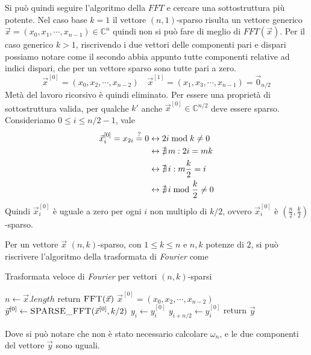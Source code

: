 Si può quindi seguire l'algoritmo della $FFT$ e cercare una sottostruttura più potente. Nel caso base $k=1$ il vettore $\left( n,1 \right)$-sparso risulta un vettore generico $\vec{x}=\left( x_0, x_1,\cdots, x _{n-1} \right) \in \mathbb{C}^n$ quindi non si può fare di meglio di $FFT\left( \vec{x} \right)$. Per il caso generico $k>1$, riscrivendo i due vettori delle componenti pari e dispari possiamo notare come il secondo abbia appunto tutte componenti relative ad indici dispari, che per un vettore sparso sono tutte pari a zero.
\begin{equation*}
    \vec{x}^{[0]}=\left( x_0, x_2,\cdots, x _{n-2} \right)
    \quad 
    \vec{x}^{[1]}=\left( x_1, x_3,\cdots, x _{n-1} \right) = \vec{0}_{n/2}
\end{equation*}
Metà del lavoro ricorsivo è quindi eliminato.
Per essere una proprietà di sottostruttura valida, per qualche $k'$ anche $\vec{x}^{[0]} \in \mathbb{C}^{n/2}$ deve essere sparso. Consideriamo $0 \leq i \leq n/2-1$, vale
\begin{align*}
    \vec{x}_i^{[0]} = x_{2i} \overset{?}{=} 0 
    & \leftrightarrow
    2i \bmod k \neq 0
    \\
    & \leftrightarrow
    \nexists \, m : 2i = mk
    \\
    & \leftrightarrow
    \nexists \, i : m\frac{k}{2} = i
    \\
    & \leftrightarrow
    \nexists \, i \bmod \frac{k}{2} \neq 0
\end{align*}
Quindi $\vec{x}_i^{[0]}$ è uguale a zero per ogni $i$ non multiplo di $k/2$, ovvero $\vec{x}_i^{[0]}$ è $\left( \frac{n}{2}, \frac{k}{2} \right)$-sparso.

Per un vettore $\vec{x}$ $(n,k)$-sparso, con $1 \leq k \leq n$ e $n,k$ potenze di $2$, si può riscrivere l'algoritmo della trasformata di \textit{Fourier} come
\begin{algorithm}[H]
    \caption{Trasformata veloce di \textit{Fourier} per vettori $(n,k)$-sparsi}\label{alg:fftsparsa}
\begin{algorithmic}[1]
        \State $n \gets \vec{x}.length$
            \State return $\Call{FFT}{\vec{x}}$
        \EndIf
        \State $\vec{x}^{[0]}=\left( x_0, x_2,\cdots, x _{n-2} \right)$
        \State $\vec{y}^{[0]} \gets \Call{SPARSE\_FFT}{\vec{x}^{[0]}, k/2}$
            \State $y_{i} \gets y_{i}^{[0]}$
            \State $y_{i+n/2} \gets y_{i}^{[0]}$
        \EndFor
        \State return $\vec{y}$
    \EndProcedure
\end{algorithmic}
\end{algorithm}
Dove si può notare che non è stato necessario calcolare $\omega_n$, e le due componenti del vettore $\vec{y}$ sono uguali.

